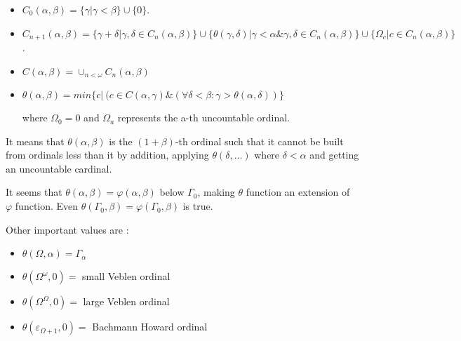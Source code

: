 \documentclass[10pt]{article}
\begin{document}
\begin{itemize}

\item \( C_0(\alpha,\beta) = \lbrace \gamma|\gamma<\beta \rbrace \cup \lbrace 0 \rbrace \).

\item \( C_{n+1}(\alpha,\beta) = \lbrace \gamma+\delta|\gamma,\delta \in C_n(\alpha,\beta) \rbrace \cup \lbrace \theta(\gamma,\delta)|\gamma<\alpha \& \gamma,\delta \in C_n(\alpha,\beta) \rbrace \cup \lbrace \Omega_c|c \in C_n(\alpha,\beta) \rbrace \).

\item \( C(\alpha,\beta) = \cup_{n<\omega} C_n(\alpha,\beta) \)

\item \( \theta(\alpha,\beta) = min \lbrace c|~(c \in C(\alpha,\gamma) \& (\forall \delta<\beta:\gamma>\theta(\alpha,\delta)) \rbrace \)

where \( \Omega_0 = 0 \) and \( \Omega_a \) represents the a-th uncountable ordinal.

\end{itemize}

It means that \( \theta(\alpha,\beta) \) is the \( (1+\beta) \)-th ordinal such that it cannot be built from ordinals less than it by addition, applying \( \theta(\delta,\ldots) \) where \( \delta < \alpha \) and getting an uncountable cardinal.

It seems that \( \theta(\alpha,\beta) = \varphi(\alpha,\beta) \) below \( \Gamma_0 \), making \( \theta \) function an extension of \( \varphi \) function. Even \( \theta(\Gamma_0,\beta) = \varphi(\Gamma_0,\beta) \) is true.

\bigskip

Other important values are :

\begin{itemize}

\item \( \theta(\Omega,\alpha) = \Gamma_\alpha \)

\item \( \theta(\Omega^\omega,0) = \) small Veblen ordinal

\item \( \theta(\Omega^\Omega,0) = \) large Veblen ordinal

\item \( \theta(\varepsilon_{\Omega+1},0) = \) Bachmann Howard ordinal

\end{itemize}
\end{document}
